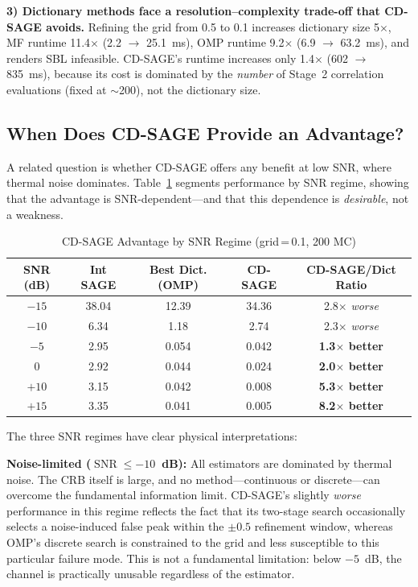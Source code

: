 \documentclass[a4paper,fleqn]{cas-dc}
\DeclareMathOperator{\SNR}{SNR}
\begin{document}
\textbf{3) Dictionary methods face a resolution--complexity trade-off that CD-SAGE avoids.} Refining the grid from 0.5 to 0.1 increases dictionary size 5$\times$, MF runtime 11.4$\times$ (2.2 $\to$ \SI{25.1}{ms}), OMP runtime 9.2$\times$ (6.9 $\to$ \SI{63.2}{ms}), and renders SBL infeasible. CD-SAGE's runtime increases only 1.4$\times$ (602 $\to$ \SI{835}{ms}), because its cost is dominated by the \textit{number} of Stage~2 correlation evaluations (fixed at $\sim$200), not the dictionary size.

\subsection{When Does CD-SAGE Provide an Advantage?}

A related question is whether CD-SAGE offers any benefit at low SNR, where thermal noise dominates. Table~\ref{tab:snr_regime} segments performance by SNR regime, showing that the advantage is SNR-dependent---and that this dependence is \textit{desirable}, not a weakness.

\begin{table}[width=.9\linewidth,cols=5,pos=h]
\centering
\caption{CD-SAGE Advantage by SNR Regime (grid$\,$=$\,$0.1, 200 MC)}
\label{tab:snr_regime}
\small
\begin{tabular*}{\tblwidth}{@{}ccccc@{}}
\toprule
SNR (dB) & Int SAGE & Best Dict. (OMP) & CD-SAGE & CD-SAGE/Dict Ratio \\
\midrule
$-15$ & 38.04 & 12.39 & 34.36 & 2.8$\times$ \textit{worse} \\
$-10$ &  6.34 &  1.18 &  2.74 & 2.3$\times$ \textit{worse} \\
$ -5$ &  2.95 &  0.054 & 0.042 & \textbf{1.3$\times$ better} \\
$  0$ &  2.92 &  0.044 & 0.024 & \textbf{2.0$\times$ better} \\
$+10$ &  3.15 &  0.042 & 0.008 & \textbf{5.3$\times$ better} \\
$+15$ &  3.35 &  0.041 & 0.005 & \textbf{8.2$\times$ better} \\
\bottomrule
\end{tabular*}
\end{table}

The three SNR regimes have clear physical interpretations:

\textbf{Noise-limited ($\SNR \le -10$~dB):} All estimators are dominated by thermal noise. The CRB itself is large, and no method---continuous or discrete---can overcome the fundamental information limit. CD-SAGE's slightly \textit{worse} performance in this regime reflects the fact that its two-stage search occasionally selects a noise-induced false peak within the $\pm 0.5$ refinement window, whereas OMP's discrete search is constrained to the grid and less susceptible to this particular failure mode. This is not a fundamental limitation: below $-5$~dB, the channel is practically unusable regardless of the estimator.
\end{document}
